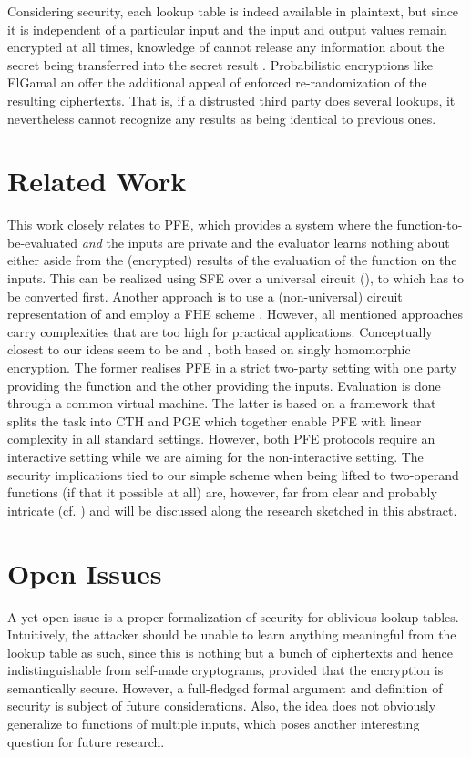 \documentclass{llncs}
\begin{document}
Considering security, each lookup table is indeed available in plaintext, but
since it is independent of a particular input and the input and output values
remain encrypted at all times, knowledge of  cannot release any
information about the secret  being transferred into the secret result
. Probabilistic encryptions like ElGamal an offer the additional appeal
of enforced re-randomization of the resulting ciphertexts. That is, if a
distrusted third party does several lookups, it nevertheless cannot recognize
any results as being identical to previous ones.

\section{Related Work}

This work closely relates to \ac{PFE}, which provides a system where the
function-to-be-evaluated  \emph{and} the inputs are private and the
evaluator learns nothing about either aside from the (encrypted) results of
the evaluation of the function on the inputs. This can be realized using
\ac{SFE} over a universal circuit
(\cite{KolesnikovSchneider2008,Valiant1976}), to which  has to be
converted first. Another approach is to use a (non-universal) circuit
representation of  and employ a \ac{FHE} scheme
\cite{Gentry2009,Silverberg2013}. However, all mentioned approaches carry
complexities that are too high for practical applications. Conceptually
closest to our ideas seem to be \cite{KatzMalka2011} and
\cite{MohasselSadeghian2013}, both based on singly homomorphic encryption.
The former realises \ac{PFE} in a strict two-party setting with one party
providing the function and the other providing the inputs. Evaluation is done
through a common virtual machine. The latter is based on a framework that
splits the task into \ac{CTH} and \ac{PGE} which together enable \ac{PFE}
with linear complexity in all standard settings. However, both \ac{PFE}
protocols require an interactive setting while we are aiming for the
non-interactive setting. The security implications tied to our simple scheme
when being lifted to two-operand functions (if that it possible at all) are,
however, far from clear and probably intricate (cf. \cite{Boneh2011}) and
will be discussed along the research sketched in this abstract.

\section{Open Issues}
A yet open issue is a proper formalization of security for oblivious lookup
tables. Intuitively, the attacker should be unable to learn anything
meaningful from the lookup table as such, since this is nothing but a bunch
of ciphertexts and hence indistinguishable from self-made cryptograms,
provided that the encryption is semantically secure. However, a full-fledged
formal argument and definition of security is subject of future
considerations. Also, the idea does not obviously generalize to functions of
multiple inputs, which poses another interesting question for future
research.
\end{document}
